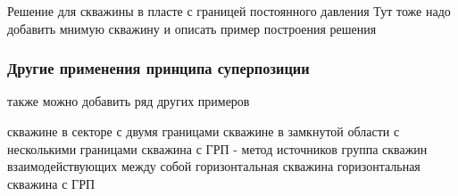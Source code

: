 Решение для скважины в пласте с границей постоянного давления 
Тут тоже надо добавить мнимую скважину и описать пример построения решения


\subsubsection{Другие применения принципа суперпозиции}
также можно добавить ряд других примеров

скважине в секторе с двумя границами
скважине в замкнутой области с несколькими границами 
скважина с ГРП - метод источников
группа скважин взаимодействующих между собой
горизонтальная скважина
горизонтальная скважина с ГРП
